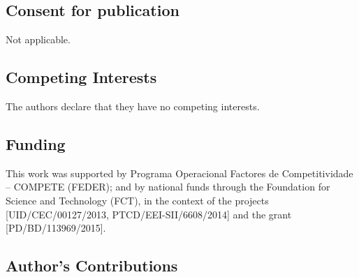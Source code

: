 \documentclass[a4paper,num-refs]{oup-contemporary}
\begin{document}



\subsection{Consent for publication}
Not applicable.



\subsection{Competing Interests}
The authors declare that they have no competing interests.


\subsection{Funding}
This work was supported by Programa Operacional Factores de Competitividade -- COMPETE (FEDER); and by national funds through the Foundation for Science and Technology (FCT), in the context of the projects [UID/CEC/00127/2013, PTCD/EEI-SII/6608/2014] and the grant [PD/BD/113969/2015].


\subsection{Author's Contributions}
\end{document}
